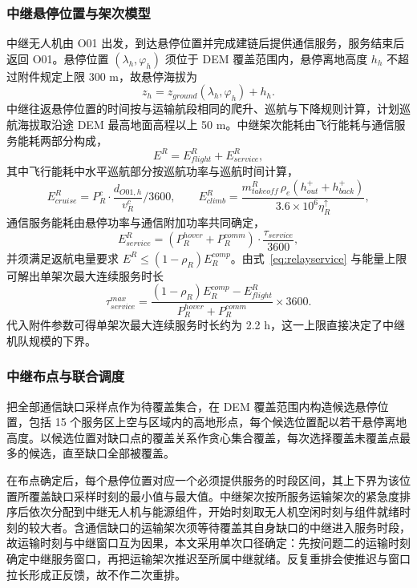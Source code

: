 \documentclass[bwprint]{gmcmthesis}
\begin{document}
\subsubsection{中继悬停位置与架次模型}
中继无人机由 O01 出发，到达悬停位置并完成建链后提供通信服务，服务结束后返回 O01。悬停位置 $(\lambda_h,\varphi_h)$ 须位于 DEM 覆盖范围内，悬停离地高度 $h_h$ 不超过附件规定上限 300 m，故悬停海拔为
\begin{equation}
z_h=z_{ground}\!\left(\lambda_h,\varphi_h\right)+h_h .
\label{eq:hoveralt}
\end{equation}
中继往返悬停位置的时间按与运输航段相同的爬升、巡航与下降规则计算，计划巡航海拔取沿途 DEM 最高地面高程以上 50 m。中继架次能耗由飞行能耗与通信服务能耗两部分构成，
\begin{equation}
E^{R}=E^{R}_{flight}+E^{R}_{service},
\label{eq:relayenergy}
\end{equation}
其中飞行能耗中水平巡航部分按巡航功率与巡航时间计算，
\begin{equation}
E^{R}_{cruise}=P^{c}_{R}\cdot\frac{d_{O01,h}}{v^{c}_{R}}\Big/3600,
\qquad
E^{R}_{climb}=\frac{m^{R}_{takeoff}\,\rho_e\left(h^{+}_{out}+h^{+}_{back}\right)}{3.6\times10^{6}\eta^{\uparrow}_{R}},
\label{eq:relayflight}
\end{equation}
通信服务能耗由悬停功率与通信附加功率共同确定，
\begin{equation}
E^{R}_{service}=\left(P^{hover}_{R}+P^{comm}_{R}\right)\cdot\frac{\tau_{service}}{3600},
\label{eq:relayservice}
\end{equation}
并须满足返航电量要求 $E^{R}\le\left(1-\rho_R\right)E^{comp}_{R}$。由式~\eqref{eq:relayservice} 与能量上限可解出单架次最大连续服务时长
\begin{equation}
\tau^{max}_{service}=\frac{\left(1-\rho_R\right)E^{comp}_{R}-E^{R}_{flight}}{P^{hover}_{R}+P^{comm}_{R}}\times3600 .
\label{eq:svcmax}
\end{equation}
代入附件参数可得单架次最大连续服务时长约为 2.2 h，这一上限直接决定了中继机队规模的下界。

\subsubsection{中继布点与联合调度}
把全部通信缺口采样点作为待覆盖集合，在 DEM 覆盖范围内构造候选悬停位置，包括 15 个服务区上空与区域内的高地形点，每个候选位置配以若干悬停离地高度。以候选位置对缺口点的覆盖关系作贪心集合覆盖，每次选择覆盖未覆盖点最多的候选，直至缺口全部被覆盖。

在布点确定后，每个悬停位置对应一个必须提供服务的时段区间，其上下界为该位置所覆盖缺口采样时刻的最小值与最大值。中继架次按所服务运输架次的紧急度排序后依次分配到中继无人机与能源组件，开始时刻取无人机空闲时刻与组件就绪时刻的较大者。含通信缺口的运输架次须等待覆盖其自身缺口的中继进入服务时段，故运输时刻与中继窗口互为因果，本文采用单次口径确定：先按问题二的运输时刻确定中继服务窗口，再把运输架次推迟至所属中继就绪。反复重排会使推迟与窗口拉长形成正反馈，故不作二次重排。
\end{document}
